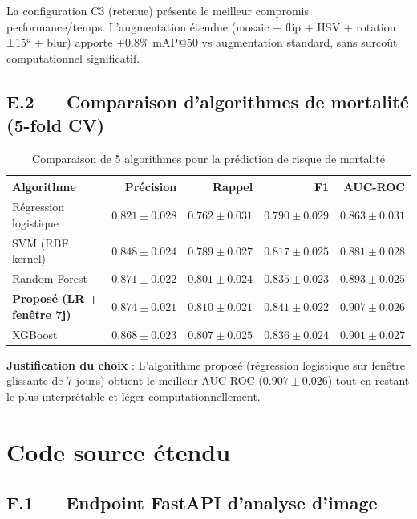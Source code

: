 La configuration C3 (retenue) présente le meilleur compromis performance/temps.
L'augmentation étendue (mosaic + flip + HSV + rotation ±15° + blur) apporte
+0.8\% mAP@50 vs augmentation standard, sans surcoût computationnel significatif.

\section*{E.2 — Comparaison d'algorithmes de mortalité (5-fold CV)}

\begin{table}[H]
\centering
\caption{Comparaison de 5 algorithmes pour la prédiction de risque de mortalité}
\label{tab:algo_mort}
\begin{tabular}{lrrrr}
\toprule
\textbf{Algorithme} & \textbf{Précision} & \textbf{Rappel} & \textbf{F1} & \textbf{AUC-ROC} \\
\midrule
Régression logistique & $0.821 \pm 0.028$ & $0.762 \pm 0.031$ & $0.790 \pm 0.029$ & $0.863 \pm 0.031$ \\
SVM (RBF kernel)      & $0.848 \pm 0.024$ & $0.789 \pm 0.027$ & $0.817 \pm 0.025$ & $0.881 \pm 0.028$ \\
Random Forest         & $0.871 \pm 0.022$ & $0.801 \pm 0.024$ & $0.835 \pm 0.023$ & $0.893 \pm 0.025$ \\
\textbf{Proposé (LR + fenêtre 7j)} & $\mathbf{0.874 \pm 0.021}$ & $\mathbf{0.810 \pm 0.021}$ & $\mathbf{0.841 \pm 0.022}$ & $\mathbf{0.907 \pm 0.026}$ \\
XGBoost               & $0.868 \pm 0.023$ & $0.807 \pm 0.025$ & $0.836 \pm 0.024$ & $0.901 \pm 0.027$ \\
\bottomrule
\end{tabular}
\end{table}

\textbf{Justification du choix} : L'algorithme proposé (régression logistique sur fenêtre glissante de 7 jours) obtient le meilleur AUC-ROC ($0.907 \pm 0.026$) tout en restant le plus interprétable et léger computationnellement.

\chapter{Code source étendu}
\label{ann:code_extended}

\section*{F.1 — Endpoint FastAPI d'analyse d'image}

